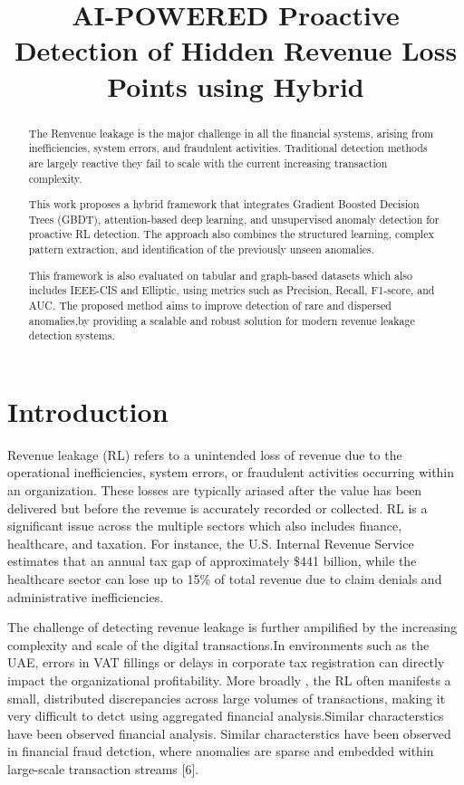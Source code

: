 \documentclass[conference]{IEEEtran}
\title{AI-POWERED Proactive Detection of Hidden Revenue Loss Points using Hybrid}
\author{
\IEEEauthorblockN{Shambhavi Jha, Venkata Shreya Vella}
\IEEEauthorblockA{Department of Computer Science \\
BITS Pilani, Dubai Campus \\
Email: f20230009@dubai.bits-pilani.ac.in, f20230096@dubai.bits-pilani.ac.in}
}
\begin{document}
\maketitle

\begin{abstract}

The Renvenue leakage is the major challenge in  all the financial systems, arising from inefficiencies, system errors, and fraudulent activities. Traditional detection methods are largely reactive they fail to scale with the current increasing transaction complexity.

This work proposes a hybrid framework that integrates Gradient Boosted Decision Trees (GBDT), attention-based deep learning, and unsupervised anomaly detection for proactive RL detection. The approach also combines the structured learning, complex pattern extraction, and identification of the previously unseen anomalies. 

This framework is also evaluated on tabular and graph-based datasets which also includes IEEE-CIS and Elliptic, using metrics such as Precision, Recall, F1-score, and AUC. The proposed method aims to improve detection of rare and dispersed anomalies,by providing a scalable and robust solution for modern revenue leakage detection systems.

\end{abstract}

\section{Introduction}

Revenue leakage (RL) refers to a unintended loss of revenue due to the operational inefficiencies, system errors, or fraudulent activities occurring within an organization. These losses are typically ariased  after the value has been delivered but before the revenue is accurately recorded or collected. RL is a significant issue across the multiple sectors which also includes finance, healthcare, and taxation. For instance, the U.S. Internal Revenue Service estimates that an annual tax gap of approximately \$441 billion, while the healthcare sector can lose up to 15\% of total revenue due to claim denials and administrative inefficiencies.

The challenge of detecting revenue leakage is further ampilified by the increasing complexity and scale of the digital transactions.In environments such as the UAE, errors in VAT fillings or delays in corporate tax registration can directly impact the organizational profitability. More broadly , the RL often manifests a small, distributed discrepancies across large volumes of transactions, making it very difficult to detct using aggregated financial analysis.Similar characterstics have been observed financial analysis. Similar characterstics have been observed in financial fraud detction, where anomalies are sparse and embedded within large-scale transaction streams [6].
\end{document}
